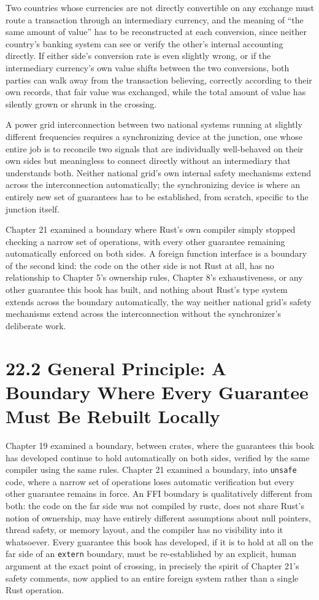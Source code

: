 \documentclass[11pt]{book}
\begin{document}
Two countries whose currencies are not directly convertible on any exchange must route a transaction through an intermediary currency, and the meaning of ``the same amount of value'' has to be reconstructed at each conversion, since neither country's banking system can see or verify the other's internal accounting directly. If either side's conversion rate is even slightly wrong, or if the intermediary currency's own value shifts between the two conversions, both parties can walk away from the transaction believing, correctly according to their own records, that fair value was exchanged, while the total amount of value has silently grown or shrunk in the crossing.

A power grid interconnection between two national systems running at slightly different frequencies requires a synchronizing device at the junction, one whose entire job is to reconcile two signals that are individually well-behaved on their own sides but meaningless to connect directly without an intermediary that understands both. Neither national grid's own internal safety mechanisms extend across the interconnection automatically; the synchronizing device is where an entirely new set of guarantees has to be established, from scratch, specific to the junction itself.

Chapter 21 examined a boundary where Rust's own compiler simply stopped checking a narrow set of operations, with every other guarantee remaining automatically enforced on both sides. A foreign function interface is a boundary of the second kind: the code on the other side is not Rust at all, has no relationship to Chapter 5's ownership rules, Chapter 8's exhaustiveness, or any other guarantee this book has built, and nothing about Rust's type system extends across the boundary automatically, the way neither national grid's safety mechanisms extend across the interconnection without the synchronizer's deliberate work.

\section*{22.2 General Principle: A Boundary Where Every Guarantee Must Be Rebuilt Locally}

Chapter 19 examined a boundary, between crates, where the guarantees this book has developed continue to hold automatically on both sides, verified by the same compiler using the same rules. Chapter 21 examined a boundary, into \texttt{unsafe} code, where a narrow set of operations loses automatic verification but every other guarantee remains in force. An FFI boundary is qualitatively different from both: the code on the far side was not compiled by rustc, does not share Rust's notion of ownership, may have entirely different assumptions about null pointers, thread safety, or memory layout, and the compiler has no visibility into it whatsoever. Every guarantee this book has developed, if it is to hold at all on the far side of an \texttt{extern} boundary, must be re-established by an explicit, human argument at the exact point of crossing, in precisely the spirit of Chapter 21's safety comments, now applied to an entire foreign system rather than a single Rust operation.
\end{document}
